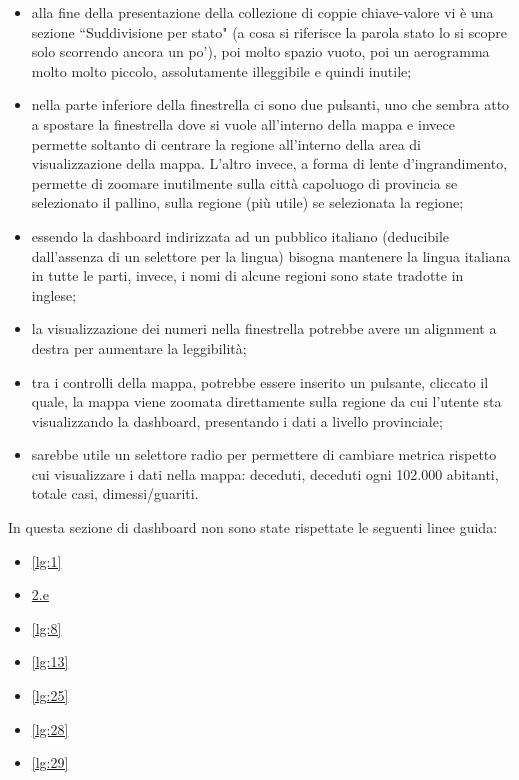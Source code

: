 \begin{itemize}
    \item alla fine della presentazione della collezione di coppie chiave-valore vi è una sezione ``Suddivisione per stato" (a cosa si riferisce la parola stato lo si scopre solo scorrendo ancora un po'), poi molto spazio vuoto, poi un aerogramma molto molto piccolo, assolutamente illeggibile e quindi inutile;
    \item nella parte inferiore della finestrella ci sono due pulsanti, uno che sembra atto a spostare la finestrella dove si vuole all'interno della mappa e invece permette soltanto di centrare la regione all'interno della area di visualizzazione della mappa. L'altro invece, a forma di lente d'ingrandimento, permette di zoomare inutilmente sulla città capoluogo di provincia se selezionato il pallino, sulla regione (più utile) se selezionata la regione;
    \item essendo la dashboard indirizzata ad un pubblico italiano (deducibile dall'assenza di un selettore per la lingua) bisogna mantenere la lingua italiana in tutte le parti, invece, i nomi di alcune regioni sono state tradotte in inglese;
    \item la visualizzazione dei numeri nella finestrella potrebbe avere un alignment a destra per aumentare la leggibilità;
    \item tra i controlli della mappa, potrebbe essere inserito un pulsante, cliccato il quale, la mappa viene zoomata direttamente sulla regione da cui l'utente sta visualizzando la dashboard, presentando i dati a livello provinciale;
    \item sarebbe utile un selettore radio per permettere di cambiare metrica rispetto cui visualizzare i dati nella mappa: deceduti, deceduti ogni 102.000 abitanti, totale casi, dimessi/guariti.
\end{itemize}
In questa sezione di dashboard non sono state rispettate le seguenti linee guida:
\begin{itemize}
    \item \ref{lg:1}
    \item \hyperref[lg:2.e]{2.e}
    \item \ref{lg:8}
    \item \ref{lg:13}
    \item \ref{lg:25}
    \item \ref{lg:28}
    \item \ref{lg:29}
\end{itemize}

